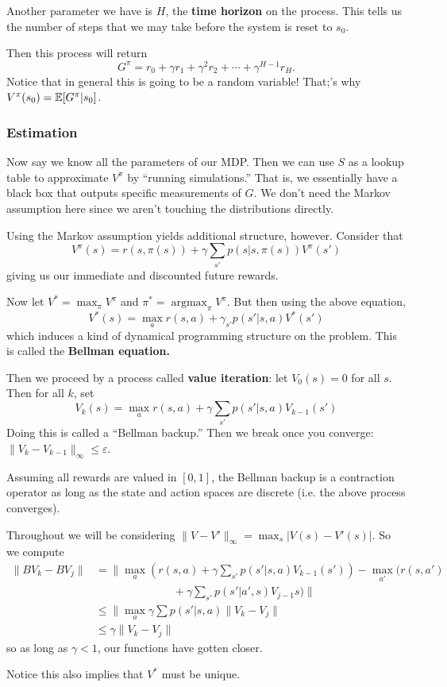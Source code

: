 \documentclass[12pt]{article}
\DeclareMathOperator*{\argmax}{argmax}
\begin{document}
Another parameter we have is $H$, the \textbf{time horizon} on the process. This tells us the number of steps that we may take before the system is reset to $s_0$.

Then this process will return
\[G^\pi=r_{0}+\gamma r_{1}+\gamma^2r_2+\cdots+\gamma^{H-1}r_H.\]
Notice that in general this is going to be a random variable! That;'s why $V^\pi(s_0)=\mathbb{E}[G^\pi|s_0]$.

\subsubsection{Estimation}
Now say we know all the parameters of our MDP. Then we can use $S$ as a lookup table to approximate $V^\pi$ by ``running simulations.'' That is, we essentially 
have a black box that outputs specific measurements of $G$. We don't need the Markov assumption here since we aren't touching the distributions directly.

Using the Markov assumption yields additional structure, however. Consider that 
\[V^\pi(s)= r(s,\pi(s))+\gamma\sum_{s'}p(s|s,\pi(s))V^\pi(s')\]
giving us our immediate and discounted future rewards.

Now let $V^\ast=\max_{\pi}V^\pi$ and $\pi^\ast=\argmax_\pi V^\pi$. But then using the above equation,
\[V^\ast(s)=\max_a r(s,a)+\gamma_{s'}p(s'|s,a)V^\ast(s')\]
which induces a kind of dynamical programming structure on the problem. This is called the \textbf{Bellman equation.}

Then we proceed by a process called \textbf{value iteration}: let $V_0(s)=0$ for all $s$. Then for all $k$, set 
\[V_k(s)=\max_a r(s,a)+\gamma\sum_{s'}p(s'|s,a)V_{k-1}(s')\]
Doing this is called a ``Bellman backup.'' Then we break once you converge: $\|V_k-V_{k-1}\|_\infty\le\varepsilon$.

\begin{lem}
	Assuming all rewards are valued in $[0,1]$, the Bellman backup is a contraction operator as long as the state and action spaces are discrete (i.e. the above process converges).
\end{lem}
\begin{prf}
	Throughout we will be considering $\|V-V'\|_\infty=\max_s|V(s)-V'(s)|$. So we compute 
	\begin{align*}
		\|BV_k-BV_j\|&=\|\max_a(r(s,a)+\gamma\sum_{s'}p(s'|s,a)V_{k-1}(s'))-\max_{a'}(r(s,a')\\
		&\qquad\qquad\qquad\quad +\gamma\sum_{s'}p(s'|a',s)V_{j-1}s)\|\\
		&\le\|\max_a \gamma\sum p(s'|s,a)\|V_k-V_j\|\\
		&\le \gamma\|V_k-V_j\|
	\end{align*}
	so as long as $\gamma<1$, our functions have gotten closer.
\end{prf}
\begin{rmk}
	Notice this also implies that $V^\ast$ must be unique.
\end{rmk}
\end{document}
